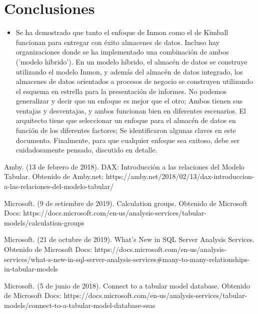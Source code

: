 \documentclass[twoside,twocolumn]{article}
\begin{document}

\section{Conclusiones}
\begin{itemize}	
\item
Se ha demostrado que tanto el enfoque de Inmon como el de Kimball funcionan para entregar con éxito almacenes de datos. Incluso hay organizaciones donde se ha implementado una combinación de ambos ('modelo híbrido'). En un modelo híbrido, el almacén de datos se construye utilizando el modelo Inmon, y además del almacén de datos integrado, los almacenes de datos orientados a procesos de negocio se construyen utilizando el esquema en estrella para la presentación de informes. No podemos generalizar y decir que un enfoque es mejor que el otro; Ambos tienen sus ventajas y desventajas, y ambos funcionan bien en diferentes escenarios. El arquitecto tiene que seleccionar un enfoque para el almacén de datos en función de los diferentes factores; Se identificaron algunas claves en este documento. Finalmente, para que cualquier enfoque sea exitoso, debe ser cuidadosamente pensado, discutido en detalle.
\end{itemize} 





\begin{thebibliography}{99} 

\bibitem[1]{}
\newblock Amby. (13 de febrero de 2018). DAX: Introducción a las relaciones del Modelo Tabular. Obtenido de Amby.net: https://amby.net/2018/02/13/dax-introduccion-a-las-relaciones-del-modelo-tabular/

\bibitem[2]{}
\newblock Microsoft. (9 de setiembre de 2019). Calculation groups. Obtenido de Microsoft Docs: https://docs.microsoft.com/en-us/analysis-services/tabular-models/calculation-groups

\bibitem[3]{}
\newblock Microsoft. (21 de octubre de 2019). What's New in SQL Server Analysis Services. Obtenido de Microsoft Docs: https://docs.microsoft.com/en-us/analysis-services/what-s-new-in-sql-server-analysis-services\#many-to-many-relationships-in-tabular-models

\bibitem[4]{}
\newblock Microsoft. (5 de junio de 2018). Connect to a tabular model database. Obtenido de Microsoft Docs: https://docs.microsoft.com/en-us/analysis-services/tabular-models/connect-to-a-tabular-model-database-ssas


\end{thebibliography}


\end{document}
